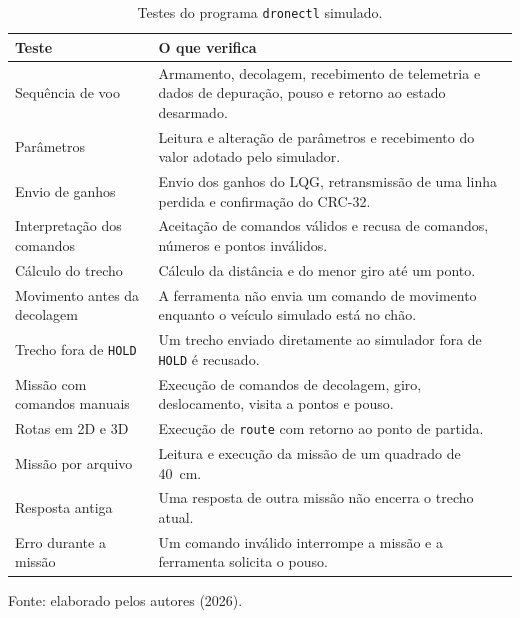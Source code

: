 \begin{table}[H]
    \centering
    \caption{Testes do programa \texttt{dronectl} simulado.}
    \label{tab:com_testes}
    \small
    \renewcommand{\arraystretch}{1.25}
    \begin{tabular}{p{4.5cm}p{9.3cm}}
        \hline
        \textbf{Teste} & \textbf{O que verifica} \\
        \hline
        Sequência de voo &
        Armamento, decolagem, recebimento de telemetria e dados de depuração, pouso e retorno ao estado desarmado. \\
        Parâmetros &
        Leitura e alteração de parâmetros e recebimento do valor adotado pelo simulador. \\
        Envio de ganhos &
        Envio dos ganhos do LQG, retransmissão de uma linha perdida e confirmação do CRC-32. \\
        Interpretação dos comandos &
        Aceitação de comandos válidos e recusa de comandos, números e pontos inválidos. \\
        Cálculo do trecho &
        Cálculo da distância e do menor giro até um ponto. \\
        Movimento antes da decolagem &
        A ferramenta não envia um comando de movimento enquanto o veículo simulado está no chão. \\
        Trecho fora de \texttt{HOLD} &
        Um trecho enviado diretamente ao simulador fora de \texttt{HOLD} é recusado. \\
        Missão com comandos manuais &
        Execução de comandos de decolagem, giro, deslocamento, visita a pontos e pouso. \\
        Rotas em 2D e 3D &
        Execução de \texttt{route} com retorno ao ponto de partida. \\
        Missão por arquivo &
        Leitura e execução da missão de um quadrado de 40~cm. \\
        Resposta antiga &
        Uma resposta de outra missão não encerra o trecho atual. \\
        Erro durante a missão &
        Um comando inválido interrompe a missão e a ferramenta solicita o pouso. \\
        \hline
    \end{tabular}
    \par\vspace{0.2cm}
    \footnotesize Fonte: elaborado pelos autores (2026).
\end{table}

